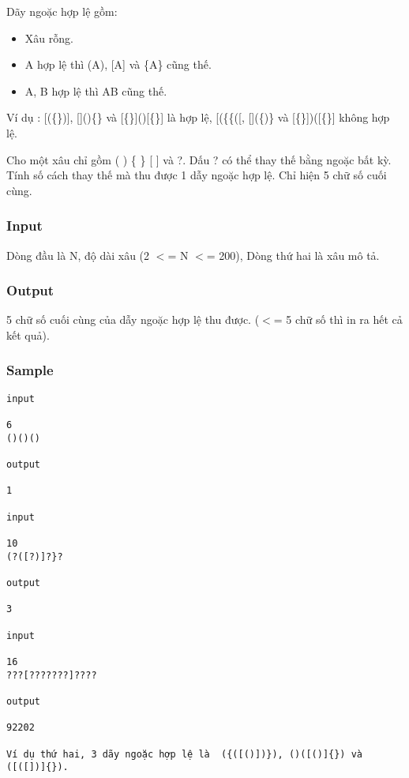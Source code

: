 

Dãy ngoặc hợp lệ gồm:
\begin{itemize}
	\item Xâu rỗng.
	\item A hợp lệ thì (A), [A] và \{A\} cũng thế.
	\item A, B hợp lệ thì AB cũng thế.
\end{itemize}

Ví dụ : [(\{\})], []()\{\} và [\{\}]()[\{\}] là hợp lệ, [(\{\{([, [](\{)\} và [\{\}])([\{\}] không hợp lệ.

Cho một xâu chỉ gồm ( ) \{ \} [ ] và ?. Dấu ? có thể thay thế bằng ngoặc bất kỳ. Tính số cách thay thế mà thu được 1 dẫy ngoặc hợp lệ. Chỉ hiện 5 chữ số cuối cùng.

\subsubsection{Input}

Dòng đầu là N, độ dài xâu (2 $<$= N $<$= 200), Dòng thứ hai là xâu mô tả.

\subsubsection{Output}

5 chữ số cuối cùng của dẫy ngoặc hợp lệ thu được. ($<$= 5 chữ số thì in ra hết cả kết quả).

\subsubsection{Sample}
\begin{verbatim}
input 

6 
()()() 
 
output 
 
1 

input 
 
10 
(?([?)]?}? 
 
output 
 
3

input 
 
16 
???[???????]???? 
 
output 
 
92202

Ví dụ thứ hai, 3 dãy ngoặc hợp lệ là  ({([()])}), ()([()]{}) và ([([])]{}).
\end{verbatim}